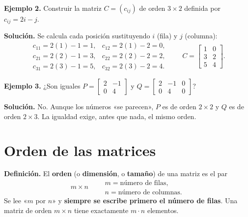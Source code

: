 \documentclass[12pt, letterpaper]{article}
\newcommand{\mwmat}[1]{\ensuremath{\begin{bmatrix}#1\end{bmatrix}}}
\begin{document}
\begin{cuadrosolucion}
  \small
  \textbf{Ejemplo 2.} Construir la matriz $C=(c_{ij})$ de orden $3\times2$
  definida por $c_{ij}=2i-j$.

  \medskip
  \textbf{Solución.} Se calcula cada posición sustituyendo $i$ (fila) y $j$
  (columna):
  \[
    \begin{array}{ll}
      c_{11}=2(1)-1=1, & c_{12}=2(1)-2=0,\\[2pt]
      c_{21}=2(2)-1=3, & c_{22}=2(2)-2=2,\\[2pt]
      c_{31}=2(3)-1=5, & c_{32}=2(3)-2=4.
    \end{array}
    \qquad
    C=\mwmat{1 & 0\\ 3 & 2\\ 5 & 4}.
  \]
\end{cuadrosolucion}

\begin{cuadrosolucion}
  \small
  \textbf{Ejemplo 3.} ¿Son iguales
  $P=\mwmat{2 & -1\\ 0 & 4}$ y $Q=\mwmat{2 & -1 & 0\\ 0 & 4 & 0}$?

  \medskip
  \textbf{Solución.} No. Aunque los números «se parecen», $P$ es de orden
  $2\times2$ y $Q$ es de orden $2\times3$. La igualdad exige, antes que nada,
  el mismo orden.
\end{cuadrosolucion}

\section{Orden de las matrices}

\begin{cuadroteoria}
  \small
  \textbf{Definición.} El \textbf{orden} (o \textbf{dimensión}, o
  \textbf{tamaño}) de una matriz es el par
  \[
    m\times n
    \qquad
    \begin{array}{l}
      m=\text{número de filas},\\[2pt]
      n=\text{número de columnas}.
    \end{array}
  \]
  Se lee «$m$ por $n$» y \textbf{siempre se escribe primero el número de
  filas}. Una matriz de orden $m\times n$ tiene exactamente $m\cdot n$
  elementos.
\end{cuadroteoria}
\end{document}
